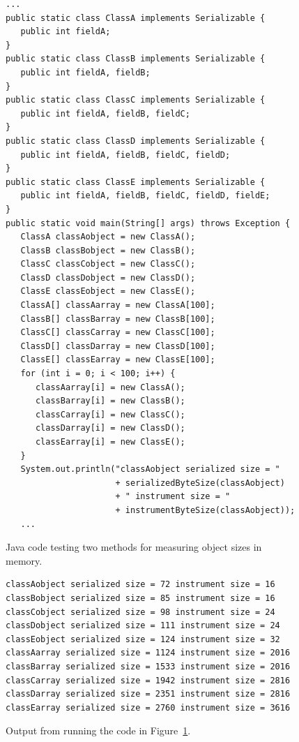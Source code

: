 \begin{figure}
\begin{verbatim}
...
public static class ClassA implements Serializable {
   public int fieldA;
}
public static class ClassB implements Serializable {
   public int fieldA, fieldB;
}
public static class ClassC implements Serializable {
   public int fieldA, fieldB, fieldC;
}
public static class ClassD implements Serializable {
   public int fieldA, fieldB, fieldC, fieldD;
}
public static class ClassE implements Serializable {
   public int fieldA, fieldB, fieldC, fieldD, fieldE;
}
public static void main(String[] args) throws Exception {
   ClassA classAobject = new ClassA();
   ClassB classBobject = new ClassB();
   ClassC classCobject = new ClassC();
   ClassD classDobject = new ClassD();
   ClassE classEobject = new ClassE();
   ClassA[] classAarray = new ClassA[100];
   ClassB[] classBarray = new ClassB[100];
   ClassC[] classCarray = new ClassC[100];
   ClassD[] classDarray = new ClassD[100];
   ClassE[] classEarray = new ClassE[100];
   for (int i = 0; i < 100; i++) {
      classAarray[i] = new ClassA();
      classBarray[i] = new ClassB();
      classCarray[i] = new ClassC();
      classDarray[i] = new ClassD();
      classEarray[i] = new ClassE();
   }
   System.out.println("classAobject serialized size = "
                      + serializedByteSize(classAobject)
                      + " instrument size = "
                      + instrumentByteSize(classAobject));
   ...
\end{verbatim}
\caption{Java code testing two methods for measuring object sizes in memory.}
\label{fig:javacode}
\end{figure}

\begin{figure}
\begin{verbatim}
classAobject serialized size = 72 instrument size = 16
classBobject serialized size = 85 instrument size = 16
classCobject serialized size = 98 instrument size = 24
classDobject serialized size = 111 instrument size = 24
classEobject serialized size = 124 instrument size = 32
classAarray serialized size = 1124 instrument size = 2016
classBarray serialized size = 1533 instrument size = 2016
classCarray serialized size = 1942 instrument size = 2816
classDarray serialized size = 2351 instrument size = 2816
classEarray serialized size = 2760 instrument size = 3616
\end{verbatim}
\caption{Output from running the code in Figure~\ref{fig:javacode}.}
\label{fig:javaoutput}
\end{figure}


